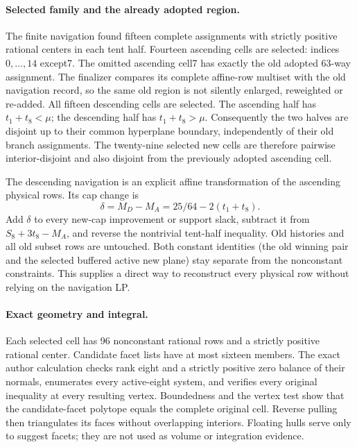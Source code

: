 \paragraph{Selected family and the already adopted region.}
The finite navigation found fifteen complete assignments with strictly
positive rational centers in each tent half. Fourteen ascending cells
are selected: indices $0,\ldots,14$ except7. The omitted ascending cell7
has exactly the old adopted 63-way assignment. The finalizer compares
its complete affine-row multiset with the old navigation record, so the
same old region is not silently enlarged, reweighted or re-added.
All fifteen descending cells are selected. The ascending half has
$t_1+t_8<\mu$; the descending half has $t_1+t_8>\mu$. Consequently the
two halves are disjoint up to their common hyperplane boundary,
independently of their old branch assignments. The twenty-nine selected
new cells are therefore pairwise interior-disjoint and also disjoint
from the previously adopted ascending cell.

The descending navigation is an explicit affine transformation of the
ascending physical rows. Its cap change is
\[
 \delta=M_D-M_A=25/64-2(t_1+t_8).
\]
Add $\delta$ to every new-cap improvement or support slack, subtract it
from $S_8+3t_8-M_A$, and reverse the nontrivial tent-half inequality.
Old histories and all old subset rows are untouched. Both constant
identities (the old winning pair and the selected buffered active new
plane) stay separate from the nonconstant constraints. This supplies a
direct way to reconstruct every physical row without relying on the
navigation LP.

\paragraph{Exact geometry and integral.}
Each selected cell has 96 nonconstant rational rows and a strictly
positive rational center. Candidate facet lists have at most sixteen
members. The exact author calculation checks rank eight and a strictly
positive zero balance of their normals, enumerates every active-eight
system, and verifies every original inequality at every resulting vertex.
Boundedness and the vertex test show that the candidate-facet polytope
equals the complete original cell. Reverse pulling then triangulates its
faces without overlapping interiors. Floating hulls serve only to suggest
facets; they are not used as volume or integration evidence.

